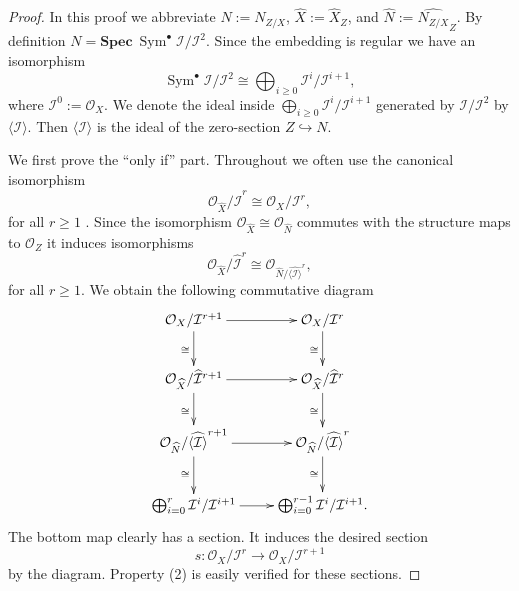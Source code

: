 \documentclass[12pt]{amsart}
\theoremstyle{definition}
\theoremstyle{property}
\newcommand\I{\mathcal I}
\renewcommand\O{\mathcal O}
\newcommand\mdot{{\scriptscriptstyle\bullet}}
\renewcommand\_{^{}_}
\newcommand\Sym{\operatorname{Sym}}
\begin{document}
\begin{proof}
In this proof we abbreviate $N:=N_{Z/X}$, $\widehat{X} := \widehat{X}_Z$, and $\widehat{N} := \widehat{N_{Z/X}}_Z$. By definition $N = \mathbf{Spec} \ \Sym^{\mdot} \I / \I^2$. Since the embedding is regular we have an isomorphism \cite[B.7.1]{Ful}
$$
\Sym^{\mdot} \I / \I^2 \cong \bigoplus_{i \geq 0} \I^i / \I^{i+1}, 
$$
where $\I^0 := \O_X$. We denote the ideal inside $\bigoplus_{i \geq 0} \I^i / \I^{i+1}$ generated by $\I / \I^2$ by $\langle \I \rangle$. Then $\langle \I \rangle$ is the ideal of the zero-section $Z \hookrightarrow N$.

We first prove the ``only if'' part. Throughout we often use the canonical isomorphism 
$$
\O_{\widehat{X}} / \widehat{\I}^r \cong \O_X / \I^r,
$$
for all $r \geq 1$ \cite[Cor.~II.9.8]{Har}. Since the isomorphism $\O_{\widehat{X}} \cong \O_{\widehat{N}}$ commutes with the structure maps to $\O_Z$ it induces isomorphisms
$$
\O_{\widehat{X}} / \widehat{\I}^r \cong \O_{\widehat{N} / \widehat{\langle \I \rangle}^r},
$$
for all $r \geq 1$. We obtain the following commutative diagram
\begin{displaymath}
\xymatrix
{
\O_X / \I^{r+1} \ar[r] \ar_{\cong}[d] & \O_X / \I^r \ar_{\cong}[d] \\
\O_{\widehat{X}} / \widehat{\I}^{r+1} \ar[r] \ar_{\cong}[d] & \O_{\widehat{X}} / \widehat{\I}^r \ar_{\cong}[d] \\
\O_{\widehat{N}} / \widehat{\langle \I \rangle}^{r+1} \ar[r] \ar_{\cong}[d] & \O_{\widehat{N}} / \widehat{\langle \I \rangle}^r \ar_{\cong}[d] \\
\bigoplus_{i=0}^{r} \I^i / \I^{i+1} \ar[r] & \bigoplus_{i=0}^{r-1} \I^i / \I^{i+1}.
}
\end{displaymath}
The bottom map clearly has a section. It induces the desired section
$$
s : \O_X / \I^r \longrightarrow \O_X / \I^{r+1}
$$
by the diagram. Property (2) is easily verified for these sections.


\end{proof}
\end{document}
